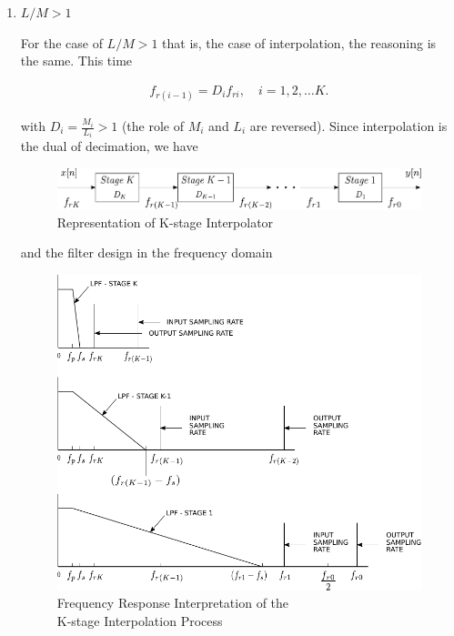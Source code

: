 \begin{itemize}
\begin{enumerate}
 
	 	\item $L/M > 1$
	 	
	 	For the case of $L/M > 1$ that is, the case of interpolation, the reasoning is the same. This time
	 	
	 	\begin{align}
	 		f_{r(i-1)} = D_i f_{ri} , \quad i = 1,2,\dots K.
	 	\end{align}
	 	
	 	with  $D_i = \frac{M_i}{L_i} > 1$ (the role of $M_i$ and $L_i$ are reversed). Since interpolation is the dual of decimation, we have 
	 	
	 	\begin{figure}[ht!]
	 		\centering
	 		\includegraphics[scale = 0.6]{multistage_down_1.pdf}
	 		\caption{Representation of K-stage Interpolator}\label{Figure 3.15}
	 	\end{figure}
	 	
	 	and the filter design in the frequency domain
	 	
	 	\newpage
	 	
	 	\begin{figure}[ht!]
	 		\centering
	 		\hspace*{2mm}
	 		\includegraphics[scale = 0.77]{multistage_down_2.pdf}
	 		\caption{Frequency Response Interpretation of the \\ K-stage Interpolation Process}\label{Figure 3.16}
	 	\end{figure}
	 	

\end{enumerate}
\end{itemize}
